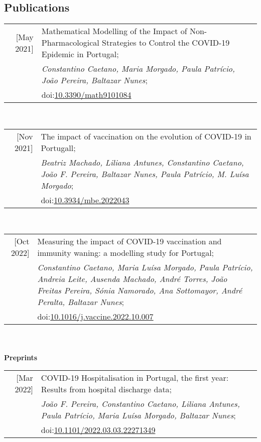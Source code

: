 \documentclass[11pt,oneside,a4paper,titlepage]{article}
\begin{document}
\subsection{  Publications}
\begin{tabular}{N P}
[May 2021] & Mathematical Modelling of the Impact of Non-Pharmacological Strategies to Control the COVID-19 Epidemic in Portugal;\\
& \textit{Constantino Caetano, Maria Morgado, Paula Patrício, João Pereira, Baltazar Nunes};\\
& doi:\href{https://doi.org/10.3390/math9101084}{10.3390/math9101084}\\
\end{tabular}
\\
\begin{tabular}{N P}
[Nov 2021] & The impact of vaccination on the evolution of COVID-19 in Portugall;\\
& \textit{Beatriz Machado, Liliana Antunes, Constantino Caetano, João F. Pereira, Baltazar Nunes, Paula Patrício, M. Luísa Morgado};\\
& doi:\href{https://doi.org/10.3934/mbe.2022043}{10.3934/mbe.2022043}\\
\end{tabular}
\\
\begin{tabular}{N P}
[Oct 2022] & Measuring the impact of COVID-19 vaccination and immunity waning: a modelling study for Portugal;\\
& \textit{Constantino Caetano, Maria Luísa Morgado, Paula Patrício, Andreia Leite, Ausenda Machado, André Torres, João Freitas Pereira, Sónia Namorado, Ana Sottomayor, André Peralta, Baltazar Nunes};\\
& doi:\href{https://doi.org/10.1016/j.vaccine.2022.10.007}{10.1016/j.vaccine.2022.10.007}\\
\end{tabular}
\\
\\
\textcolor{textGrey}{\textbf{Preprints}}
\\
\begin{tabular}{N P}
[Mar 2022] & COVID-19 Hospitalisation in Portugal, the first year: Results from hospital discharge data;\\
& \textit{João F. Pereira, Constantino Caetano, Liliana Antunes, Paula Patrício, Maria Luísa Morgado, Baltazar Nunes};\\
& doi:\href{https://doi.org/10.1101/2022.03.03.22271349}{10.1101/2022.03.03.22271349}\\
\end{tabular}
\end{document}
